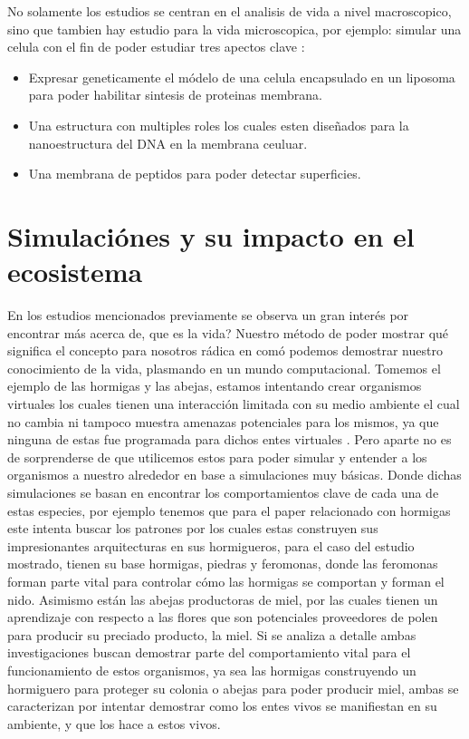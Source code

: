 \documentclass[conference]{IEEEtran}
\begin{document}
No solamente los estudios se centran en el analisis de vida a nivel macroscopico, sino que tambien hay estudio para la vida microscopica, por ejemplo: simular una celula con el fin de poder estudiar tres apectos clave
\cite{shinji01} :
\begin{itemize}
\item Expresar geneticamente el m\'odelo de una celula encapsulado en un liposoma para poder habilitar sintesis de proteinas membrana. 
\item Una estructura con multiples roles los cuales esten dise\~nados para la nanoestructura del DNA en la membrana ceuluar. 
\item Una membrana de peptidos para poder detectar superficies.
\end{itemize}


\section{Simulaci\'ones y su impacto en el ecosistema}


En los estudios mencionados previamente se observa un gran inter\'es por encontrar m\'as acerca de, que es la vida? Nuestro m\'etodo de poder mostrar qu\'e significa el concepto para nosotros r\'adica en com\'o podemos demostrar nuestro conocimiento de la vida, plasmando en un mundo computacional. 
Tomemos el ejemplo de las hormigas y las abejas, estamos intentando crear organismos virtuales los cuales tienen una interacci\'on limitada con su medio ambiente el cual no cambia ni tampoco muestra amenazas potenciales para los mismos, ya que ninguna de estas fue programada para dichos entes virtuales \cite{LP01} . Pero aparte no es de sorprenderse de que utilicemos estos para poder simular y entender a los organismos a nuestro alrededor en base a simulaciones muy b\'asicas. Donde dichas simulaciones se basan en encontrar los comportamientos clave de cada una de estas especies, por ejemplo tenemos que para el paper relacionado con hormigas este intenta buscar los patrones por los cuales estas construyen sus impresionantes arquitecturas en sus hormigueros, para el caso del estudio mostrado, tienen su base hormigas, piedras y feromonas, donde las feromonas forman parte vital para controlar c\'omo las hormigas se comportan y forman el nido. 
Asimismo est\'an las abejas productoras de miel, por las cuales tienen un aprendizaje con respecto a las flores que son potenciales proveedores de polen para producir su preciado producto, la miel. 
Si se analiza a detalle ambas investigaciones buscan demostrar parte del comportamiento vital para el funcionamiento de estos organismos, ya sea las hormigas construyendo un hormiguero para proteger su colonia o abejas para poder producir miel, ambas se caracterizan por intentar demostrar como los entes vivos se manifiestan en su ambiente, y que los hace a estos vivos. \cite{ZOE01} \\
\end{document}
